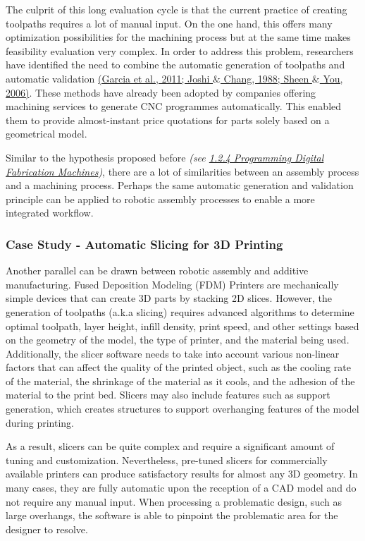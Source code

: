 \documentclass[11pt]{book}
\begin{document}
The culprit of this long evaluation cycle is that the current practice of creating toolpaths requires a lot of manual input. On the one hand, this offers many optimization possibilities for the machining process but at the same time makes feasibility evaluation very complex. In order to address this problem, researchers have identified the need to combine the automatic generation of toolpaths and automatic validation \href{https://www.zotero.org/google-docs/?2C1b7u}{(Garcia et al., 2011; Joshi $\&$ Chang, 1988; Sheen $\&$ You, 2006)}. These methods have already been adopted by companies offering machining services to generate CNC programmes automatically. This enabled them to provide almost-instant price quotations for parts solely based on a geometrical model. 

\begin{flushleft}
Similar to the hypothesis proposed before \textit{(see \underline{1.2.4 Programming Digital Fabrication Machines})}, there are a lot of similarities between an assembly process and a machining process. Perhaps the same automatic generation and validation principle can be applied to robotic assembly processes to enable a more integrated workflow.
\end{flushleft}


\subsubsection{Case Study - Automatic Slicing for 3D Printing}

Another parallel can be drawn between robotic assembly and additive manufacturing. Fused Deposition Modeling (FDM) Printers are mechanically simple devices that can create 3D parts by stacking 2D slices. However, the generation of toolpaths (a.k.a slicing) requires advanced algorithms to determine optimal toolpath, layer height, infill density, print speed, and other settings based on the geometry of the model, the type of printer, and the material being used. Additionally, the slicer software needs to take into account various non-linear factors that can affect the quality of the printed object, such as the cooling rate of the material, the shrinkage of the material as it cools, and the adhesion of the material to the print bed. Slicers may also include features such as support generation, which creates structures to support overhanging features of the model during printing. 

As a result, slicers can be quite complex and require a significant amount of tuning and customization. Nevertheless, pre-tuned slicers for commercially available printers can produce satisfactory results for almost any 3D geometry. In many cases, they are fully automatic upon the reception of a CAD model and do not require any manual input. When processing a problematic design, such as large overhangs, the software is able to pinpoint the problematic area for the designer to resolve. 
\end{document}
